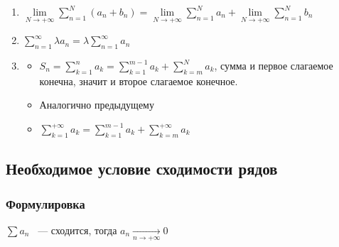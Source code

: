 \documentclass{article}
\begin{document}
                \begin{enumerate}
                
                    \item $\lim\limits_{N \rightarrow +\infty} \sum\limits^N_{n = 1} (a_n + b_n) = \lim\limits_{N \rightarrow +\infty} \sum\limits^N_{n = 1} a_n + \lim\limits_{N \rightarrow +\infty} \sum\limits^N_{n = 1} b_n$
                    
                    \item $\sum\limits^{\infty}_{n = 1} \lambda a_n = \lambda \sum\limits^{\infty}_{n = 1} a_n$
                    
                    \item
                    
                        \begin{itemize}
                        
                            \item $S_n = \sum\limits^n_{k = 1} a_k = \sum\limits^{m - 1}_{k = 1} a_k + \sum\limits_{k = m}^N a_k$, сумма и первое слагаемое конечна, значит и второе слагаемое конечное.
                            
                            \item Аналогично предыдущему
                            
                            \item $\sum\limits^{+\infty}_{k = 1} a_k = \sum\limits^{m - 1}_{k = 1} a_k + \sum\limits^{+\infty}_{k = m} a_k$
                            
                        \end{itemize}
                        
                \end{enumerate}
        
        \subsection{Необходимое условие сходимости рядов}
        
            \subsubsection{Формулировка}
            
                $\sum a_n$ ~--- сходится, тогда $a_n \xrightarrow[n \rightarrow +\infty]{} 0$
                
\end{document}
